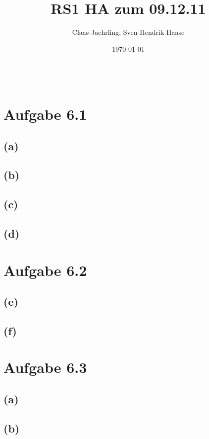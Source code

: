 \documentclass[12pt]{article}
\author{Claas Jaehrling, Sven-Hendrik Haase}
\title{RS1 HA zum 09.12.11}
\date{\today}
\begin{document}
\setcounter{secnumdepth}{0}
\maketitle
\begin{align}
\end{align}


\section{Aufgabe 6.1}
\subsection{(a)}

\subsection{(b)}

\subsection{(c)}

\subsection{(d)}


\section{Aufgabe 6.2}
\subsection{(e)}

\subsection{(f)}


\section{Aufgabe 6.3}
\subsection{(a)}

\subsection{(b)}
\end{document}

